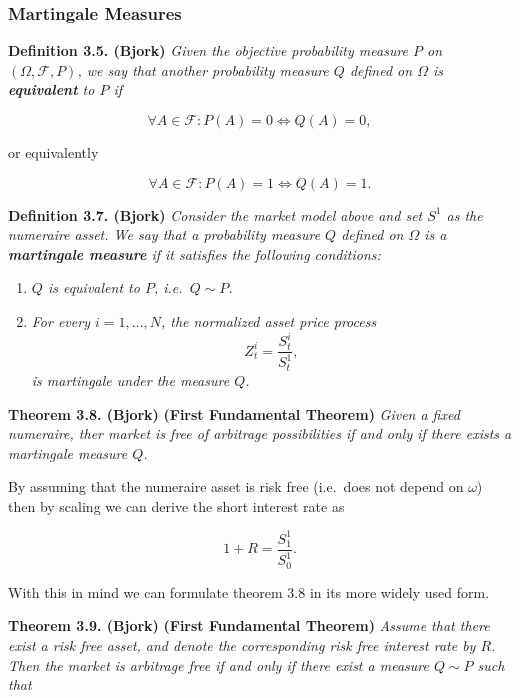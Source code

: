 \documentclass[
]{book}
\providecommand{\tightlist}{%
  \setlength{\itemsep}{0pt}\setlength{\parskip}{0pt}}
\begin{document}
\hypertarget{martingale-measures}{%
\subsubsection{Martingale Measures}\label{martingale-measures}}

\textbf{Definition 3.5. (Bjork)} \emph{Given the objective probability measure \(P\) on \((\Omega,\mathcal{F},P)\), we say that another probability measure \(Q\) defined on \(\Omega\) is \textbf{equivalent} to \(P\) if}

\[
\forall A\in\mathcal{F}:P(A)=0\iff Q(A)=0,
\]

or equivalently

\[
\forall A\in\mathcal{F}:P(A)=1\iff Q(A)=1.
\]

\textbf{Definition 3.7. (Bjork)} \emph{Consider the market model above and set \(S^1\) as the numeraire asset. We say that a probability measure \(Q\) defined on \(\Omega\) is a \textbf{martingale measure} if it satisfies the following conditions:}

\begin{enumerate}
\def\labelenumi{\arabic{enumi}.}
\tightlist
\item
  \emph{\(Q\) is equivalent to \(P\), i.e.~\(Q\sim P\).}
\item
  \emph{For every \(i=1,...,N\), the normalized asset price process}
  \[
    Z_t^i=\frac{S_t^i}{S_t^1},
    \]
  \emph{is martingale under the measure \(Q\).}
\end{enumerate}

\textbf{Theorem 3.8. (Bjork)} \textbf{(First Fundamental Theorem)} \emph{Given a fixed numeraire, ther market is free of arbitrage possibilities if and only if there exists a martingale measure \(Q\).}

By assuming that the numeraire asset is risk free (i.e.~does not depend on \(\omega\)) then by scaling we can derive the short interest rate as

\[
1+R=\frac{S_1^1}{S_0^1}.
\]

With this in mind we can formulate theorem 3.8 in its more widely used form.

\textbf{Theorem 3.9. (Bjork)} \textbf{(First Fundamental Theorem)} \emph{Assume that there exist a risk free asset, and denote the corresponding risk free interest rate by \(R\). Then the market is arbitrage free if and only if there exist a measure \(Q\sim P\) such that}
\end{document}
